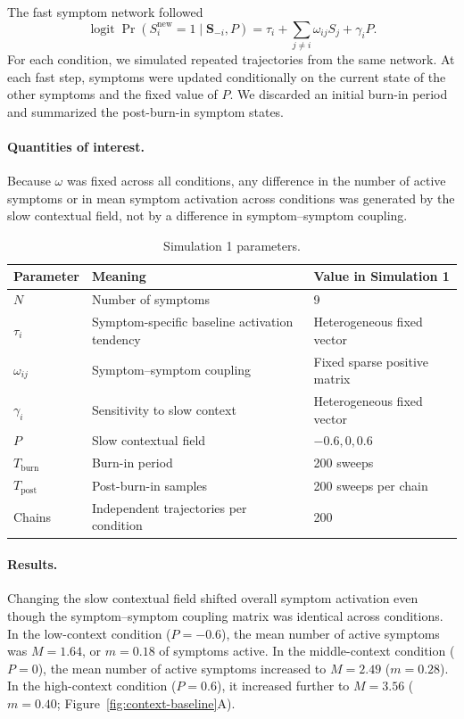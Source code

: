 \documentclass[man,12pt,floatsintext]{apa7}
\begin{document}
The fast symptom network followed
\[
\operatorname{logit}\Pr(S_i^{\mathrm{new}}=1\mid \mathbf S_{-i},P)
=
\tau_i+\sum_{j\neq i}\omega_{ij}S_j+\gamma_iP .
\]
For each condition, we simulated repeated trajectories from the same network.
At each fast step, symptoms were updated conditionally on the current state of
the other symptoms and the fixed value of \(P\). We discarded an initial burn-in
period and summarized the post-burn-in symptom states.

\paragraph{Quantities of interest.}
Because \(\omega\) was fixed across all conditions, any difference in the
number of active symptoms or in mean symptom activation across conditions was
generated by the slow contextual field, not by a difference in
symptom--symptom coupling.

\begin{table}[ht]
\centering
\caption{Simulation 1 parameters.}
\label{tab:sim1_parameters}
\begin{tabular}{lll}
\hline
Parameter & Meaning & Value in Simulation 1 \\
\hline
\(N\) & Number of symptoms & 9 \\
\(\tau_i\) & Symptom-specific baseline activation tendency & Heterogeneous fixed vector \\
\(\omega_{ij}\) & Symptom--symptom coupling & Fixed sparse positive matrix \\
\(\gamma_i\) & Sensitivity to slow context & Heterogeneous fixed vector \\
\(P\) & Slow contextual field & \(-0.6, 0, 0.6\) \\
\(T_{\mathrm{burn}}\) & Burn-in period & 200 sweeps \\
\(T_{\mathrm{post}}\) & Post-burn-in samples & 200 sweeps per chain \\
Chains & Independent trajectories per condition & 200 \\
\hline
\end{tabular}
\end{table}

\paragraph{Results.}
Changing the slow contextual field shifted overall symptom activation even
though the symptom--symptom coupling matrix was identical across conditions. In
the low-context condition (\(P=-0.6\)), the mean number of active symptoms was
\(M=1.64\), or \(m=0.18\) of symptoms active. In the middle-context condition
(\(P=0\)), the mean number of active symptoms increased to \(M=2.49\)
(\(m=0.28\)). In the high-context condition (\(P=0.6\)), it increased further
to \(M=3.56\) (\(m=0.40\); Figure~\ref{fig:context-baseline}A).
\end{document}
